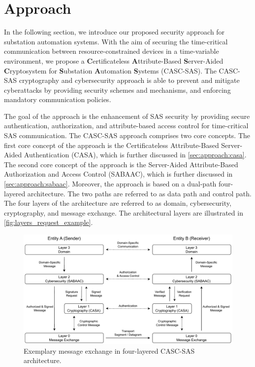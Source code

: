 \chapter{Approach}
\label{ch:approach}
In the following section, we introduce our proposed security approach for substation automation systems.
With the aim of securing the time-critical communication between resource-constrained devices in a time-variable environment, we propose a \textbf{C}ertificateless \textbf{A}ttribute-Based \textbf{S}erver-Aided \textbf{C}ryptosystem for \textbf{S}ubstation \textbf{A}utomation \textbf{S}ystems (CASC-SAS).
The CASC-SAS cryptography and cybersecurity approach is able to prevent and mitigate cyberattacks by providing security schemes and mechanisms, and enforcing mandatory communication policies.

The goal of the approach is the enhancement of SAS security by providing secure authentication, authorization, and attribute-based access control for time-critical SAS communication.
The CASC-SAS approach comprises two core concepts.
The first core concept of the approach is the Certificateless Attribute-Based Server-Aided Authentication (CASA), which is further discussed in \autoref{sec:approach:casa}.
The second core concept of the approach is the Server-Aided Attribute-Based Authorization and Access Control (SABAAC), which is further discussed in \autoref{sec:approach:sabaac}.
Moreover, the approach is based on a dual-path four-layered architecture.
The two paths are referred to as data path and control path.
The four layers of the architecture are referred to as domain, cybersecurity, cryptography, and message exchange.
The architectural layers are illustrated in \autoref{fig:layers_request_example}.
\begin{figure}
    \centering
    \includegraphics[width=0.8\linewidth]{figures/layers_request_example.drawio.pdf}
    \caption{Exemplary message exchange in four-layered CASC-SAS architecture.}
    \label{fig:layers_request_example}
\end{figure}


